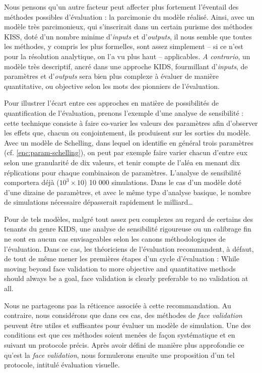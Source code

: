 Nous pensons qu'un autre facteur peut affecter plus fortement l'éventail des méthodes possibles d'évaluation : la parcimonie du modèle réalisé.
Ainsi, avec un modèle très parcimonieux, qui s'inscrirait dans un certain \og purisme\fg{} des méthodes \og KISS\fg{}, doté d'un nombre minime d'\textit{inputs} et d'\textit{outputs}, il nous semble que toutes les méthodes, y compris les plus formelles, sont assez simplement -- si ce n'est pour la résolution analytique, on l'a vu plus haut -- applicables.
\textit{A contrario}, un modèle très descriptif, ancré dans une approche \og KIDS\fg{}, fourmillant d'\textit{inputs}, de paramètres et d'\textit{outputs} sera bien plus complexe à évaluer de manière quantitative, ou \og objective\fg{} selon les mots des pionniers de l'évaluation.

Pour illustrer l'écart entre ces approches en matière de possibilités de quantification de l'évaluation, prenons l'exemple d'une analyse de sensibilité :
	cette technique consiste à faire co-varier les valeurs des paramètres afin d'observer les effets que, chacun ou conjointement, ils produisent sur les sorties du modèle.
Avec un modèle de Schelling, dans lequel on identifie en général trois paramètres (cf. \cref{enc:param-schelling}), on peut par exemple faire varier chacun d'entre eux selon une granularité de dix valeurs, et tenir compte de l'aléa en menant dix réplications pour chaque combinaison de paramètres.
L'analyse de sensibilité comportera déjà ($10^3 \times 10$) 10 000 simulations.
Dans le cas d'un modèle doté d'une dizaine de paramètres, et avec le même type d'analyse basique, le nombre de simulations nécessaire dépasserait rapidement le milliard\ldots

Pour de tels modèles, malgré tout assez peu complexes au regard de certains des tenants du genre KIDS, une analyse de sensibilité rigoureuse ou un calibrage fin ne sont en aucun cas envisageables selon les canons méthodologiques de l'évaluation.
Dans ce cas, les théoriciens de l'évaluation recommandent, à défaut, de tout de même mener les premières étapes d'un cycle d'évaluation \autocite[342]{petty2010verification} :
	\og While moving beyond face validation to more objective and quantitative methods should always be a goal, face validation is clearly preferable to no validation at all.\fg{}

Nous ne partageons pas la réticence associée à cette recommandation.
Au contraire, nous considérons que dans ces cas, des méthodes de \og \textit{face validation}\fg{} peuvent être utiles et suffisantes pour évaluer un modèle de simulation.
Une des conditions est que ces méthodes soient menées de façon systématique et en suivant un protocole précis.
Après avoir défini de manière plus approfondie ce qu'est la \textit{face validation}, nous formulerons ensuite une proposition d'un tel protocole, intitulé \og évaluation visuelle\fg{}.


